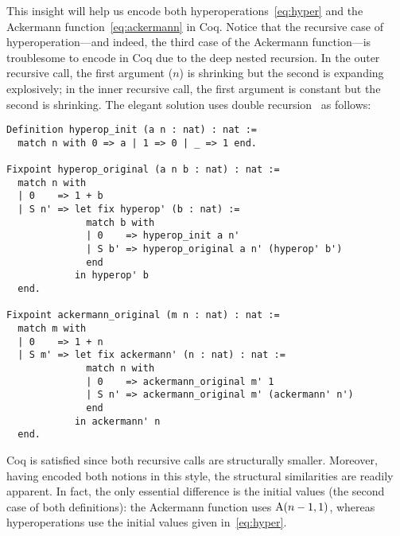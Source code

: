 This insight will help us encode both hyperoperations~\eqref{eq:hyper} and the Ackermann function~\eqref{eq:ackermann} in Coq.  Notice that the recursive case of hyperoperation---and
indeed, the third case of the Ackermann function---is troublesome to encode in Coq due to
the deep nested recursion.  In the outer recursive call, the first argument ($n$) is shrinking
but the second is expanding explosively; in the inner recursive call, the first argument is
constant but the second is shrinking. The elegant solution uses double recursion~\cite{stackoverflow} as follows:
\begin{lstlisting}
Definition hyperop_init (a n : nat) : nat :=
  match n with 0 => a | 1 => 0 | _ => 1 end.

Fixpoint hyperop_original (a n b : nat) : nat :=
  match n with
  | 0    => 1 + b
  | S n' => let fix hyperop' (b : nat) :=
              match b with
              | 0    => hyperop_init a n'
              | S b' => hyperop_original a n' (hyperop' b')
              end
            in hyperop' b
  end.

Fixpoint ackermann_original (m n : nat) : nat :=
  match m with
  | 0    => 1 + n
  | S m' => let fix ackermann' (n : nat) : nat :=
              match n with
              | 0    => ackermann_original m' 1
              | S n' => ackermann_original m' (ackermann' n')
              end
            in ackermann' n
  end.
\end{lstlisting}
Coq is satisfied since both recursive calls are structurally smaller.
Moreover, having encoded both notions in this style, the structural similarities
are readily apparent.  In fact, the only essential difference is the initial values
(the second case of both definitions): the Ackermann function uses $\text{A}(n-1,1)$, whereas
hyperoperations use the initial values given in~\eqref{eq:hyper}.

